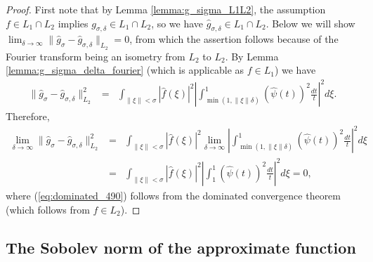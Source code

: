 \documentclass[11pt]{article}
\theoremstyle{remark}
\theoremstyle{example}
\theoremstyle{remark}
\begin{document}
\begin{proof}
First note that by Lemma \ref{lemma:g_sigma_L1L2}, the assumption $f \in L_1 \cap L_2$ implies $g_{\sigma,\delta} \in L_1 \cap L_2$, so we have $\hat{g}_{\sigma,\delta} \in L_1 \cap L_2$.
Below we will show $\lim_{ \delta \to \infty } \| \hat{g}_\sigma - \hat{g}_{\sigma,\delta} \|_{L_2} = 0$, from which the assertion follows because of the Fourier transform being an isometry from $L_2$ to $L_2$.
By Lemma \ref{lemma:g_sigma_delta_fourier} (which is applicable as $f \in L_1$) we have
\begin{eqnarray*}
\| \hat{g}_\sigma - \hat{g}_{\sigma,\delta} \|_{L_2}^2 
&=&  \int_{ \| \xi \| < \sigma } |\hat{f}(\xi) |^2 \left|  \int_{ \min(1, \| \xi \| \delta) }^{1} (\hat{\psi} (t) )^2  \frac{dt}{t}  \right|^2 d\xi.
\end{eqnarray*}
Therefore,
\begin{eqnarray}
\lim_{\delta \to \infty}  \| \hat{g}_\sigma - \hat{g}_{\sigma,\delta} \|_{L_2}^2
&=&  \int_{ \| \xi \| < \sigma } |\hat{f}(\xi) |^2  \lim_{\delta \to \infty}   \left|  \int_{ \min(1, \| \xi \| \delta) }^{1} (\hat{\psi} (t) )^2  \frac{dt}{t}  \right|^2 d\xi \label{eq:dominated_490} \\
&=&  \int_{ \| \xi \| < \sigma } |\hat{f}(\xi) |^2     \left|  \int_{1}^{1} (\hat{\psi} (t) )^2  \frac{dt}{t}  \right|^2 d\xi=0, \nonumber
\end{eqnarray}
where (\ref{eq:dominated_490}) follows from the dominated convergence theorem (which follows from $f \in L_2$).
\end{proof}







\subsection{The Sobolev norm of the approximate function}
\end{document}
